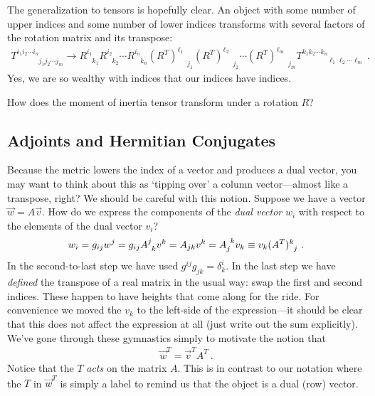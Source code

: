 The generalization to tensors is hopefully clear. An object with some number of upper indices and some number of lower indices transforms with several factors of the rotation matrix and its transpose:
\begin{align}
  T^{i_1i_2\cdots i_n}_{\phantom{i_1i_2\cdots i_n}j_1j_2\cdots j_m}
  \to 
  R^{i_1}_{\phantom{i_1}k_1}R^{i_2}_{\phantom{i_2}k_2}\cdots R^{i_n}_{\phantom{i_n}k_n}
  (R^T)^{\ell_1}_{\phantom{\ell_1}j_1}
  (R^T)^{\ell_2}_{\phantom{\ell_2}j_2}
  \cdots
  (R^T)^{\ell_m}_{\phantom{\ell_m}j_m}
  T^{k_1k_2\cdots k_n}_{\phantom{k_1k_2\cdots k_n}\ell_1\ell_2\cdots \ell_m} \ .
\end{align}
Yes, we are so wealthy with indices that our indices have indices.
\begin{exercise}
How does the moment of inertia tensor transform under a rotation $R$?
\end{exercise}

\subsection{Adjoints and Hermitian Conjugates}

Because the metric lowers the index of a vector and produces a dual vector, you may want to think about this as `tipping over' a column vector---almost like a transpose, right? We should be careful with this notion. Suppose we have a vector $\vec{w} = A \vec{v}$. How do we express the components of the \emph{dual vector} $w_i$ with respect to the elements of the dual vector $v_i$?
\begin{align}
  w_i = g_{ij}w^j
  = g_{ij}\mat{A}{j}{k} v^k
  = A_{jk}v^k
  = A_{j}^{\phantom{j}k}v_k
  \equiv 
  v_k \mat{(A^T)}{k}{j}
  \ . \label{eq:wi:and:transpose:A}
\end{align}
In the second-to-last step we have used $g^{ij}g_{jk} = \delta^i_k$. In the last step we have \emph{defined} the transpose of a real matrix in the usual way: swap the first and second indices. These happen to have heights that come along for the ride. For convenience we moved the $v_k$ to the left-side of the expression---it should be clear that this does not affect the expression at all (just write out the sum explicitly). We've gone through these gymnastics simply to motivate the notion that
\begin{align}
  \vec{w}^T = \vec{v}^T A^T \ .
\end{align}
Notice that the $T$ \emph{acts} on the matrix $A$. This is in contrast to our notation where the $T$ in $\vec{w}^T$ is simply a label to remind us that the object is a dual (row) vector.


